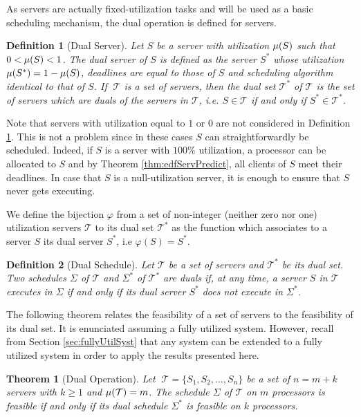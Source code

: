 \documentclass[twocolumn, compsocconf]{IEEEtran}
\newtheorem{theorem}{Theorem}[section]
\newtheorem{definition}{Definition}[section]
\newcommand{\dual}{\ensuremath{\varphi}}
\newcommand{\sched}{\ensuremath{\Sigma}\xspace}
\newcommand{\servSet}{\ensuremath{\mathcal{T}}}
\newcounter{proc}
\begin{document}
As servers are actually fixed-utilization tasks and will be used as a basic
scheduling mechanism, the dual operation is defined for servers.

\begin{definition}[Dual Server]\label{dfn:dualServer}
  Let $S$ be a server with utilization $\mu(S)$ such that $0 < \mu(S) <
  1$. The dual server of $S$ is defined as the server $S^*$ whose utilization
  $\mu(S^*) = 1 - \mu(S)$, deadlines are equal to those of $S$ and
  scheduling algorithm identical to that of $S$. If $\;\servSet$ is a set of
  servers, then the dual set $\servSet^*$ of $\servSet$ is the set of servers
  which are duals of the servers in $\servSet$, i.e. $S \in \servSet$ if and
  only if $S^* \in \servSet^*$.
\end{definition}

Note that servers with utilization equal to $1$ or $0$ are not considered in
Definition \ref{dfn:dualServer}. This is not a problem since in these cases $S$
can straightforwardly be scheduled. Indeed, if $S$ is a server with $100\%$
utilization, a processor can be allocated to $S$ and by Theorem
\ref{thm:edfServPredict}, all clients of $S$ meet their deadlines. In case that
$S$ is a null-utilization server, it is enough to ensure that $S$ never gets
executing.

We define the bijection $\dual$ from a set of non-integer (neither zero nor one)
utilization servers $\servSet$ to its dual set $\servSet^*$ as the function
which associates to a server $S$ its dual server $S^*$, i.e $\dual(S) = S^*$.


\begin{definition}[Dual Schedule]\label{dfn:dualSchedule}
  Let $\servSet$ be a set of servers and $\servSet^*$ be its dual set.  Two
  schedules $\sched$ of $\servSet$ and $\sched^*$ of $\servSet^*$ are duals if,
  at any time, a server $S$ in $\servSet$ executes in $\sched$ if and only if
  its dual server $S^*$ does not execute in $\sched^*$.
\end{definition}

The following theorem relates the feasibility of a set of servers to the
feasibility of its dual set. It is enunciated assuming a fully utilized
system. However, recall from Section \ref{sec:fullyUtilSyst} that any system can
be extended to a fully utilized system in order to apply the results presented
here.

\begin{theorem}[Dual Operation]\label{thm:dualSched}
  Let $\;\servSet = \{ S_1, S_2, \ldots, S_n \}$ be a set of $n = m + k$ servers
  with $k \geqslant 1$ and $\util(\servSet) = m$. The schedule $\sched$ of
  $\servSet$ on $m$ processors is feasible if and only if its dual schedule
  $\sched^*$ is feasible on $k$ processors.
\end{theorem}
\end{document}
